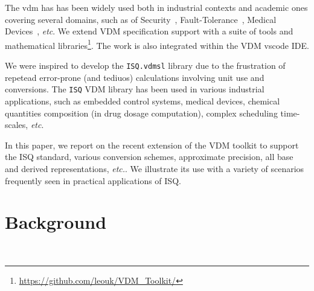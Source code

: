 \documentclass[runningheads,a4paper]{llncs}
\begin{document}
The \gls{vdm} has has been widely used both in industrial contexts and academic ones covering several domains, such as of Security~\cite{Kulik&20,Kulik&21a}, Fault-Tolerance~\cite{Nilsson&18}, Medical Devices~\cite{Macedo&08}, \textit{etc}. We extend VDM specification support with a suite of tools and mathematical libraries\footnote{\url{https://github.com/leouk/VDM_Toolkit/}}. The work is also integrated within the VDM \gls{vscode} IDE\@.

We were inspired to develop the \texttt{ISQ.vdmsl} library due to the frustration of repetead error-prone (and tediuos) calculations involving unit use and conversions. The \texttt{ISQ} VDM library has been used in various industrial applications, such as embedded control systems, medical devices, chemical quantities composition (in drug dosage computation), complex scheduling time-scales, \textit{etc}.     

In this paper, we report on the recent extension of the VDM toolkit to support the ISQ standard, various conversion schemes, approximate precision, all base and derived representations, \textit{etc.}. We illustrate its use with a variety of scenarios frequently seen in practical applications of ISQ\@.    

\section{Background}~\label{sec:background}
\end{document}

